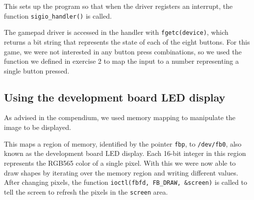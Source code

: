 

This sets up the program so that when the driver registers an interrupt, the function \texttt{sigio\_handler()} is called.


The gamepad driver is accessed in the handler with \texttt{fgetc(device)}, which returns a bit string that represents the state of each of the eight buttons.
For this game, we were not interested in any button press combinations, so we used the function we defined in exercise 2 to map the input to a number representing a single button pressed.



\newpage


\newpage


\newpage
\subsection{Using the development board LED display}
As advised in the compendium, we used memory mapping to manipulate the image to be displayed.


This maps a region of memory, identified by the pointer \texttt{fbp}, to \texttt{/dev/fb0}, also known as the development board LED display.
Each 16-bit integer in this region represents the RGB565 color of a single pixel.
With this we were now able to draw shapes by iterating over the memory region and writing different values.
After changing pixels, the function \texttt{ioctl(fbfd, FB\_DRAW, \&screen)} is called to tell the screen to refresh the pixels in the \texttt{screen} area.
